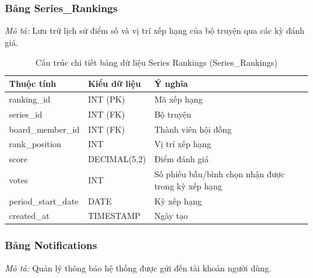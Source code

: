 \subsubsection{Bảng Series\_Rankings}
\label{subsubsec:tbl_rankings}
\textit{Mô tả:} Lưu trữ lịch sử điểm số và vị trí xếp hạng của bộ truyện qua các kỳ đánh giá.

\noindent
\begin{table}[H]
\centering
\renewcommand{\arraystretch}{1.3}
\begin{tabularx}{\textwidth}{|p{4cm}|p{3cm}|>{\raggedright\arraybackslash}X|}
\hline
\rowcolor{tableheader}
\textbf{Thuộc tính} & \textbf{Kiểu dữ liệu} & \textbf{Ý nghĩa} \\ \hline
ranking\_id & INT (PK) & Mã xếp hạng \\ \hline
series\_id & INT (FK) & Bộ truyện \\ \hline
board\_member\_id & INT (FK) & Thành viên hội đồng \\ \hline
rank\_position & INT & Vị trí xếp hạng \\ \hline
score & DECIMAL(5,2) & Điểm đánh giá \\ \hline
votes & INT & Số phiếu bầu/bình chọn nhận được trong kỳ xếp hạng \\ \hline
period\_start\_date & DATE & Kỳ xếp hạng \\ \hline
created\_at & TIMESTAMP & Ngày tạo \\ \hline
\end{tabularx}
\caption{Cấu trúc chi tiết bảng dữ liệu Series Rankings (Series\_Rankings)}
\label{tab:db_series_rankings}
\end{table}
\vspace{0.5cm}

\subsubsection{Bảng Notifications}
\label{subsubsec:tbl_notifications}
\textit{Mô tả:} Quản lý thông báo hệ thống được gửi đến tài khoản người dùng.


